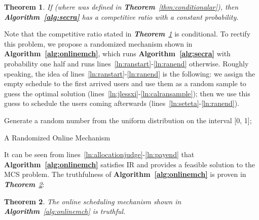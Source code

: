 \documentclass[10pt,journal,compsoc]{IEEEtran}
\newtheorem{theorem}{\textbf{Theorem}}
\begin{document}
  \begin{theorem}
    If  (where  was defined in \textit{\textbf{Theorem}~\ref{thm:conditionalar}}), then \textbf{Algorithm~\ref{alg:secra}} has a  competitive ratio with a constant probability.
    \label{thm:onlmchpartb}
  \end{theorem}
Note that the competitive ratio stated in \textit{\textbf{Theorem}~\ref{thm:onlmchpartb}} is conditional. To rectify this problem, we propose a randomized mechanism shown in \textbf{Algorithm~\ref{alg:onlinemch}}, which runs \textbf{Algorithm~\ref{alg:secra}} with probability one half and runs lines~\ref{ln:ranstart}-\ref{ln:ranend} otherwise. Roughly speaking, the idea of lines~\ref{ln:ranstart}-\ref{ln:ranend} is the following: we assign the empty schedule to the first arrived  users and use them as a random sample to guess the optimal solution  (lines~\ref{ln:jlessxi}-\ref{ln:calransample}); then we use this guess to schedule the users coming afterwards (lines~\ref{ln:seteta}-\ref{ln:ranend}).
\begin{algorithm}[htb]
Generate a random number  from the uniform distribution on the interval [0, 1];\\
    \Return{}
    \caption{A Randomized Online Mechanism} \label{alg:onlinemch}
  \end{algorithm}
It can be seen from lines~\ref{ln:allocationjudge}-\ref{ln:payend} that \textbf{Algorithm~\ref{alg:onlinemch}} satisfies IR and provides a feasible solution to the MCS problem. The truthfulness of \textbf{Algorithm~\ref{alg:onlinemch}} is proven in \textit{\textbf{Theorem}~\ref{thm:semitruthful}}:
\begin{theorem}
    The online scheduling mechanism shown in \textbf{Algorithm}~\ref{alg:onlinemch} is truthful.
    \label{thm:semitruthful}
  \end{theorem}
\end{document}
